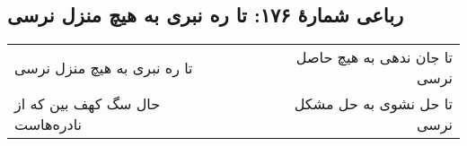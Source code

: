 \begin{center}
\section*{رباعی شمارهٔ ۱۷۶: تا ره نبری به هیچ منزل نرسی}
\label{sec:176}
\begin{longtable}{l p{0.5cm} r}
تا ره نبری به هیچ منزل نرسی
&&
تا جان ندهی به هیچ حاصل نرسی
\\
حال سگ کهف بین که از نادره‌هاست
&&
تا حل نشوی به حل مشکل نرسی
\\
\end{longtable}
\end{center}
